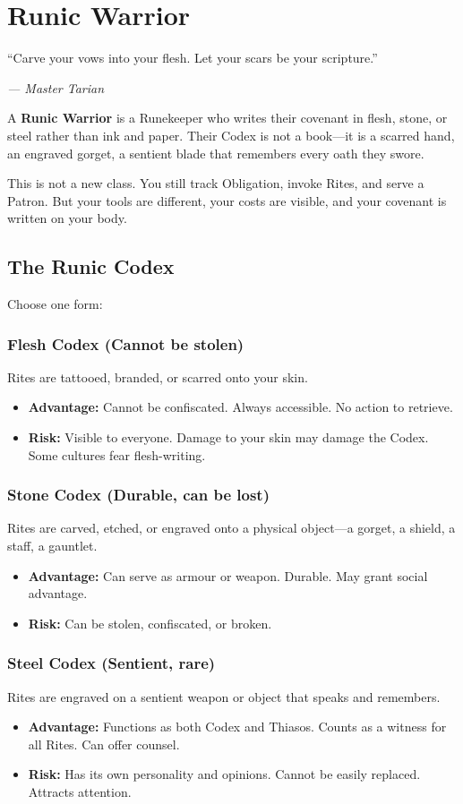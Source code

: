 \documentclass[9pt,a5paper]{extbook}
\begin{document}
\clearpage
\chapter{Runic Warrior}
\epigraph{``Carve your vows into your flesh. Let your scars be your scripture.''}{\textit{--- Master Tarian}}

A \textbf{Runic Warrior} is a Runekeeper who writes their covenant in flesh, stone, or steel rather than ink and paper. Their Codex is not a book---it is a scarred hand, an engraved gorget, a sentient blade that remembers every oath they swore.

This is not a new class. You still track Obligation, invoke Rites, and serve a Patron. But your tools are different, your costs are visible, and your covenant is written on your body.

\section{The Runic Codex}

Choose one form:

\subsection*{Flesh Codex (Cannot be stolen)}
Rites are tattooed, branded, or scarred onto your skin.
\begin{itemize}
    \item \textbf{Advantage:} Cannot be confiscated. Always accessible. No action to retrieve.
    \item \textbf{Risk:} Visible to everyone. Damage to your skin may damage the Codex. Some cultures fear flesh-writing.
\end{itemize}

\subsection*{Stone Codex (Durable, can be lost)}
Rites are carved, etched, or engraved onto a physical object---a gorget, a shield, a staff, a gauntlet.
\begin{itemize}
    \item \textbf{Advantage:} Can serve as armour or weapon. Durable. May grant social advantage.
    \item \textbf{Risk:} Can be stolen, confiscated, or broken.
\end{itemize}

\subsection*{Steel Codex (Sentient, rare)}
Rites are engraved on a sentient weapon or object that speaks and remembers.
\begin{itemize}
    \item \textbf{Advantage:} Functions as both Codex and Thiasos. Counts as a witness for all Rites. Can offer counsel.
    \item \textbf{Risk:} Has its own personality and opinions. Cannot be easily replaced. Attracts attention.
\end{itemize}
\end{document}
